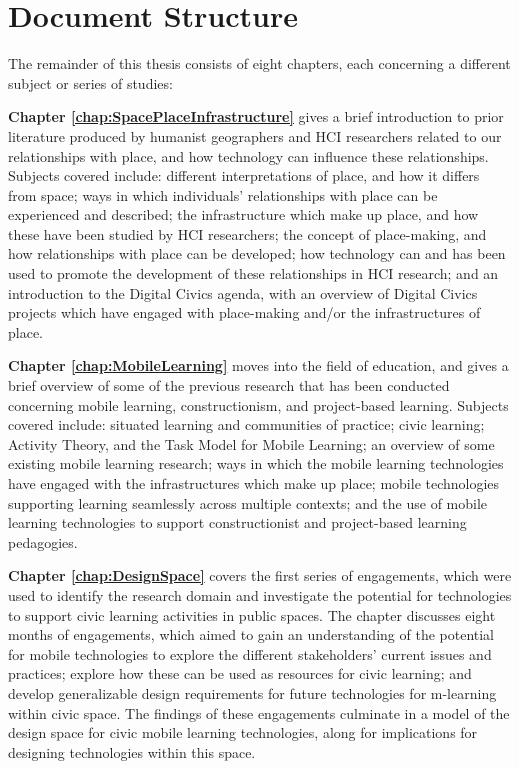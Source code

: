 \section{Document Structure}

The remainder of this thesis consists of eight chapters, each concerning a different subject or series of studies: 

\textbf{Chapter \ref{chap:SpacePlaceInfrastructure}} gives a brief introduction to prior literature produced by humanist geographers and HCI researchers related to our relationships with place, and how technology can influence these relationships. Subjects covered include: different interpretations of place, and how it differs from space; ways in which individuals' relationships with place can be experienced and described; the infrastructure which make up place, and how these have been studied by HCI researchers; the concept of place-making, and how relationships with place can be developed; how technology can and has been used to promote the development of these relationships in HCI research; and an introduction to the Digital Civics agenda, with an overview of Digital Civics projects which have engaged with place-making and/or the infrastructures of place.

\textbf{Chapter \ref{chap:MobileLearning}} moves into the field of education, and gives a brief overview of some of the previous research that has been conducted concerning mobile learning, constructionism, and project-based learning. Subjects covered include: situated learning and communities of practice; civic learning; Activity Theory, and the Task Model for Mobile Learning; an overview of some existing mobile learning research; ways in which the mobile learning technologies have engaged with the infrastructures which make up place; mobile technologies supporting learning seamlessly across multiple contexts; and the use of mobile learning technologies to support constructionist and project-based learning pedagogies.

\textbf{Chapter \ref{chap:DesignSpace}} covers the first series of engagements, which were used to identify the research domain and investigate the potential for technologies to support civic learning activities in public spaces. The chapter discusses eight months of engagements, which aimed to gain an understanding of the potential for mobile technologies to explore the different stakeholders’ current issues and practices; explore how these can be used as resources for civic learning; and develop generalizable design requirements for future technologies for m-learning within civic space. The findings of these engagements culminate in a model of the design space for civic mobile learning technologies, along for implications for designing technologies within this space.

